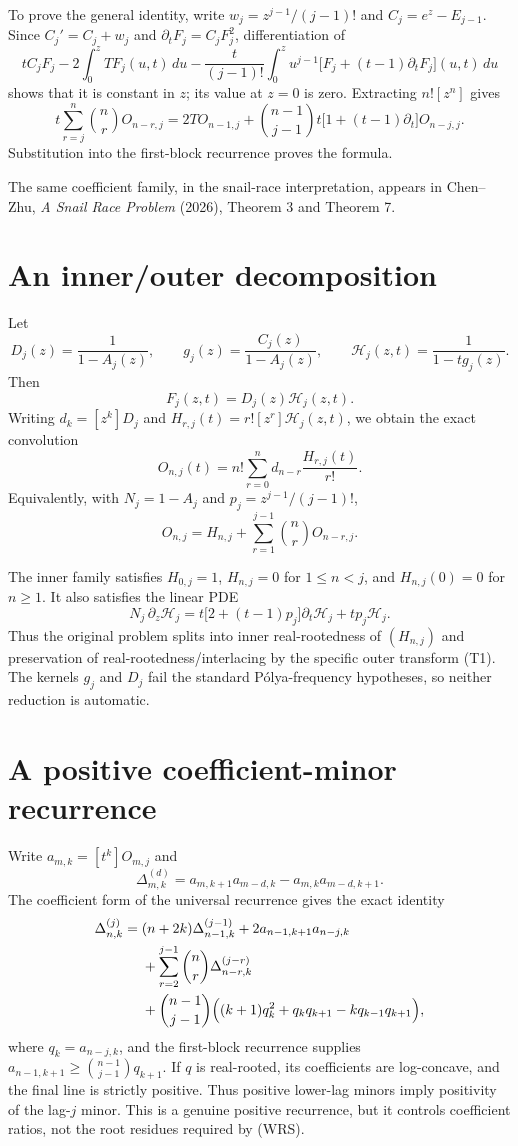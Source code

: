 \documentclass[11pt]{article}
\theoremstyle{definition}
\newcommand{\OO}{O}
\begin{document}
To prove the general identity, write \(w_j=z^{j-1}/(j-1)!\) and \(C_j=e^z-E_{j-1}\).
Since \(C_j'=C_j+w_j\) and \(\partial_tF_j=C_jF_j^2\), differentiation of
\[
tC_jF_j-2\int_0^z TF_j(u,t)\,du
-\frac{t}{(j-1)!}\int_0^z u^{j-1}
\bigl[F_j+(t-1)\partial_tF_j\bigr](u,t)\,du
\]
shows that it is constant in \(z\); its value at \(z=0\) is zero. Extracting
\(n![z^n]\) gives
\[
t\sum_{r=j}^n\binom nr\OO_{n-r,j}
=2T\OO_{n-1,j}
+\binom{n-1}{j-1}t\bigl[1+(t-1)\partial_t\bigr]\OO_{n-j,j}.
\]
Substitution into the first-block recurrence proves the formula.

The same coefficient family, in the snail-race interpretation, appears in
Chen--Zhu, \emph{A Snail Race Problem} (2026), Theorem 3 and Theorem 7.

\section{An inner/outer decomposition}

Let
\[
D_j(z)=\frac1{1-A_j(z)},\qquad g_j(z)=\frac{C_j(z)}{1-A_j(z)},\qquad
\mathcal H_j(z,t)=\frac1{1-tg_j(z)}.
\]
Then
\[
F_j(z,t)=D_j(z)\mathcal H_j(z,t).
\]
Writing \(d_k=[z^k]D_j\) and
\(H_{r,j}(t)=r![z^r]\mathcal H_j(z,t)\), we obtain the exact convolution
\[
\OO_{n,j}(t)=n!\sum_{r=0}^n d_{n-r}\frac{H_{r,j}(t)}{r!}.
\]
Equivalently, with \(N_j=1-A_j\) and \(p_j=z^{j-1}/(j-1)!\),
\[
\OO_{n,j}=H_{n,j}+\sum_{r=1}^{j-1}\binom nr\OO_{n-r,j}. \tag{T1}
\]

The inner family satisfies \(H_{0,j}=1\), \(H_{n,j}=0\) for
\(1\le n<j\), and \(H_{n,j}(0)=0\) for \(n\ge1\). It also satisfies the
linear PDE
\[
N_j\,\partial_z\mathcal H_j
=t\bigl[2+(t-1)p_j\bigr]\partial_t\mathcal H_j+t p_j\mathcal H_j.
\]
Thus the original problem splits into inner real-rootedness of
\((H_{n,j})\) and preservation of real-rootedness/interlacing by the specific
outer transform (T1). The kernels \(g_j\) and \(D_j\) fail the standard
Pólya-frequency hypotheses, so neither reduction is automatic.

\section{A positive coefficient-minor recurrence}

Write \(a_{m,k}=[t^k]\OO_{m,j}\) and
\[
\Delta^{(d)}_{m,k}=a_{m,k+1}a_{m-d,k}-a_{m,k}a_{m-d,k+1}.
\]
The coefficient form of the universal recurrence gives the exact identity
\[
\begin{aligned}
\Delta^{(j)}_{n,k}={}&(n+2k)\Delta^{(j-1)}_{n-1,k}
+2a_{n-1,k+1}a_{n-j,k}\\
&+\sum_{r=2}^{j-1}\binom nr\Delta^{(j-r)}_{n-r,k}\\
&+\binom{n-1}{j-1}\Bigl((k+1)q_k^2+q_kq_{k+1}
-kq_{k-1}q_{k+1}\Bigr),
\end{aligned}
\]
where \(q_k=a_{n-j,k}\), and the first-block recurrence supplies
\(a_{n-1,k+1}\ge\binom{n-1}{j-1}q_{k+1}\). If \(q\) is real-rooted, its
coefficients are log-concave, and the final line is strictly positive.
Thus positive lower-lag minors imply positivity of the lag-\(j\) minor.
This is a genuine positive recurrence, but it controls coefficient ratios,
not the root residues required by (WRS).
\end{document}
